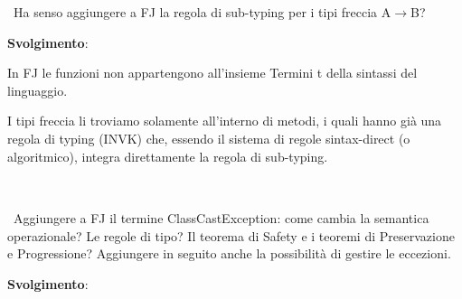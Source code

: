 \subsection*{}\
\\
\
Ha senso aggiungere a FJ la regola di sub-typing per i tipi freccia A$\rightarrow$B?


\vspace{0,5cm}
\noindent
\textbf{Svolgimento}:

\vspace{0,3cm}
In FJ le funzioni non appartengono all'insieme Termini t della sintassi del linguaggio.

I tipi freccia li troviamo solamente all'interno di metodi, i quali hanno gi\`a una regola di typing (INVK) che, essendo il sistema di  regole sintax-direct (o algoritmico), integra direttamente la regola di sub-typing.

\vspace{1cm}			 
\subsection*{}\
\\
\
Aggiungere a FJ il termine ClassCastException: come cambia la semantica operazionale? Le regole di tipo? Il teorema di Safety e i teoremi di Preservazione e Progressione? Aggiungere
in seguito anche la possibilit\`a di gestire le eccezioni.

\vspace{0,5cm}
\noindent
\textbf{Svolgimento}:
 